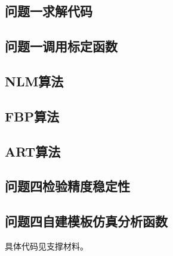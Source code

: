 \documentclass{myart}
\begin{document}
\subsection{问题一求解代码}


\subsection{问题一调用标定函数}


\subsection{NLM算法}

\subsection{FBP算法}

\subsection{ART算法}

\subsection{问题四检验精度稳定性}

\subsection{问题四自建模板仿真分析函数}
具体代码见支撑材料。





\end{document}
